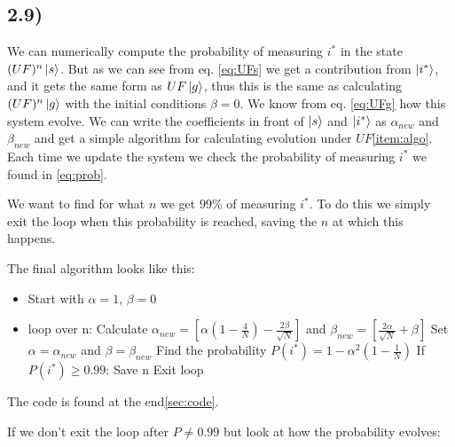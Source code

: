 \documentclass[a4paper,norsk, 10pt]{article}
\begin{document}
\subsection{2.9)}

We can numerically compute the probability of measuring $i^*$ in the state $(UF)^n\ket{s}$. But as we can see from eq. \eqref{eq:UFs} we get a contribution from $\ket{i^*}$, and it gets the same form as $UF\ket{g}$, thus this is the same as calculating $(UF)^n\ket{g}$ with the initial conditions $\beta = 0$. We know from eq. \ref{eq:UFg} how this system evolve. We can write the coefficients in front of $\ket{s}$ and $\ket{i^*}$ as $\alpha_{new}$ and $\beta_{new}$ and get a simple algorithm for calculating evolution under $UF$\eqref{item:algo}. Each time we update the system we check the probability of measuring $i^*$ we found in \eqref{eq:prob}.

We want to find for what $n$ we get $99\%$ of measuring $i^*$. To do this we simply exit the loop when this probability is reached, saving the $n$ at which this happens.

The final algorithm looks like this:

\begin{itemize}\label{item:algo}
\item Start with $\alpha = 1$, $\beta = 0$
\item loop over n:
\subitem Calculate $\alpha_{new} = \left[\alpha\left(1 - \frac{4}{N}\right) - \frac{2\beta}{\sqrt{N}}\right]$ and $\beta_{new} = \left[\frac{2\alpha}{\sqrt{N}} + \beta\right]$
\subitem Set $\alpha = \alpha_{new}$ and $\beta = \beta_{new}$
\subitem Find the probability $P(i^*) = 1 - \alpha^2\left(1 - \frac{1}{N}\right)$
\subitem If $P(i^*) \geq 0.99$:
\subsubitem Save n
\subsubitem Exit loop
\end{itemize}

The code is found at the end\ref{sec:code}.


If we don't exit the loop after $P \neq 0.99$ but look at how the probability evolves:
\end{document}

